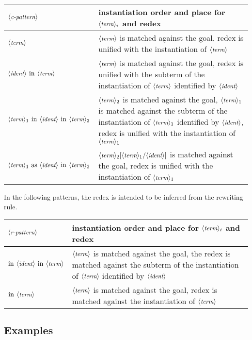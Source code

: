\begin{center}
\begin{tabularx}{\textwidth}{>{\arraybackslash}m{}|>{\arraybackslash}m{}}
$\N{c-pattern}$ & instantiation order and place for $\N{term}_i$ and redex\\
\hline
$\N{term}$ & $\N{term}$ is matched against the goal, redex is unified with
    the instantiation of $\N{term}$\\
\hline
$\N{ident}\ \C{in}\ \N{term}$ & 
    $\N{term}$ is matched against the goal, redex is 
    unified with the subterm of the 
    instantiation of $\N{term}$ identified by $\N{ident}$\\
\hline
$\N{term}_1\ \C{in}\ \N{ident}\ \C{in}\ \N{term}_2$ & 
    $\N{term}_2$ is matched against the goal, $\N{term}_1$ is 
    matched against the subterm of the 
    instantiation of $\N{term}_1$ identified by $\N{ident}$, 
    redex is unified with the instantiation of $\N{term}_1$\\
\hline
$\N{term}_1\ \C{as}\ \N{ident}\ \C{in}\ \N{term}_2$ &
    $\N{term}_2[\N{term}_1/\N{ident}]$
    is matched against the goal, 
    redex is unified with the instantiation of $\N{term}_1$\\
\hline
\end{tabularx}
\end{center}

In the following patterns, the redex is intended to be inferred from the
rewriting rule.

\begin{center}
\begin{tabularx}{\textwidth}{>{\arraybackslash}m{}|>{\arraybackslash}m{}}
$\N{r-pattern}$ & instantiation order and place for $\N{term}_i$ and redex\\
\hline
$\C{in}\ \N{ident}\ \C{in}\ \N{term}$ & 
    $\N{term}$ is matched against the goal, the redex is 
    matched against the subterm of the 
    instantiation of $\N{term}$ identified by $\N{ident}$\\
\hline
$\C{in}\ \N{term}$ & $\N{term}$ is matched against the goal, redex is 
   matched against the instantiation of $\N{term}$\\
\hline
\end{tabularx}
\end{center}

\subsection{Examples}

